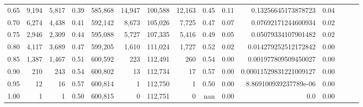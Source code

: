 \begin{tabular}{rrrrrrrrrrrrrrr}
0.65 &    9,194 &   5,817 &  0.39 &  585,868 &   14,947 &  100,588 &   12,163 &  0.45 &  0.11 &     0.13256645173878723 &      0.04 \\
0.70 &    6,274 &   4,438 &  0.41 &  592,142 &    8,673 &  105,026 &    7,725 &  0.47 &  0.07 &     0.07692171244600934 &      0.02 \\
0.75 &    2,946 &   2,309 &  0.44 &  595,088 &    5,727 &  107,335 &    5,416 &  0.49 &  0.05 &     0.05079334107901482 &      0.02 \\
0.80 &    4,117 &   3,689 &  0.47 &  599,205 &    1,610 &  111,024 &    1,727 &  0.52 &  0.02 &    0.014279252512172842 &      0.00 \\
0.85 &    1,387 &   1,467 &  0.51 &  600,592 &      223 &  112,491 &      260 &  0.54 &  0.00 &    0.001977809509450027 &      0.00 \\
0.90 &      210 &     243 &  0.54 &  600,802 &       13 &  112,734 &       17 &  0.57 &  0.00 &  0.00011529831221009127 &      0.00 \\
0.95 &       12 &      16 &  0.57 &  600,814 &        1 &  112,750 &        1 &  0.50 &  0.00 &   8.869100939237789e-06 &      0.00 \\
1.00 &        1 &       1 &  0.50 &  600,815 &        0 &  112,751 &        0 &   nan &  0.00 &                     0.0 &      0.00 \\
\bottomrule
\end{tabular}
